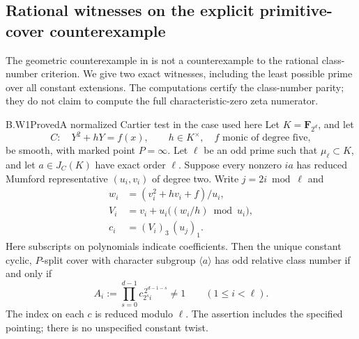 \subsection{Rational witnesses on the explicit primitive-cover counterexample}

The geometric counterexample in  is not a counterexample
to the rational class-number criterion. We give two exact witnesses,
including the least possible prime over all constant extensions.
The computations certify the class-number parity; they do not claim
to compute the full characteristic-zero zeta numerator.

\begin{claim}{B.W1}{Proved}{A normalized Cartier test in the case used here}
Let $K=\mathbf F_{2^d}$, and let
\[
 C:\quad Y^2+hY=f(x),\qquad h\in K^\times,
 \quad f\text{ monic of degree five},
\]
be smooth, with marked point $P=\infty$. Let $\ell$ be an odd prime
such that $\mu_\ell\subset K$, and let $a\in J_C(K)$ have exact
order $\ell$. Suppose every nonzero $ia$ has reduced Mumford
representative $(u_i,v_i)$ of degree two. Write $j=2i\bmod\ell$ and
\[
 \begin{split}
 w_i&=(v_i^2+hv_i+f)/u_i,\\
 V_i&=v_i+u_i\bigl((w_i/h)\bmod u_i\bigr),\\
 c_i&=(V_i)_3\,(u_j)_1.
 \end{split}
\]
Here subscripts on polynomials indicate coefficients. Then the
unique constant cyclic, $P$-split cover with character subgroup
$\langle a\rangle$ has odd relative class number if and only if
\[
 A_i:=\prod_{s=0}^{d-1}c_{2^s i}^{\,2^{d-1-s}}\ne1
       \qquad(1\le i<\ell).
\]
The index on each $c$ is reduced modulo $\ell$. The assertion includes
the specified pointing; there is no unspecified constant twist.
\end{claim}
